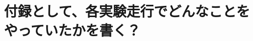 \documentclass[twocolumn,9pt]{jsproceedings}
\begin{document}
\section{付録として、各実験走行でどんなことをやっていたかを書く？}
\end{document}
